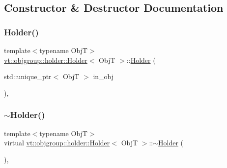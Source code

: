 \subsection{Constructor \& Destructor Documentation}
\mbox{\label{structvt_1_1objgroup_1_1holder_1_1_holder_a7e21e5a25aaef942ad43d07e14e726eb}} 
\subsubsection{\texorpdfstring{Holder()}{Holder()}}
{\footnotesize\ttfamily template$<$typename ObjT$>$ \\
\hyperlink{structvt_1_1objgroup_1_1holder_1_1_holder}{vt\+::objgroup\+::holder\+::\+Holder}$<$ ObjT $>$\+::\hyperlink{structvt_1_1objgroup_1_1holder_1_1_holder}{Holder} (\begin{DoxyParamCaption}\item[{std\+::unique\+\_\+ptr$<$ ObjT $>$}]{in\+\_\+obj }\end{DoxyParamCaption})\hspace{0.3cm}{\ttfamily [inline]}, {\ttfamily [explicit]}}

\mbox{\label{structvt_1_1objgroup_1_1holder_1_1_holder_acc7eb26ff3152043f63164898469fc78}} 
\subsubsection{\texorpdfstring{$\sim$\+Holder()}{~Holder()}}
{\footnotesize\ttfamily template$<$typename ObjT$>$ \\
virtual \hyperlink{structvt_1_1objgroup_1_1holder_1_1_holder}{vt\+::objgroup\+::holder\+::\+Holder}$<$ ObjT $>$\+::$\sim$\hyperlink{structvt_1_1objgroup_1_1holder_1_1_holder}{Holder} (\begin{DoxyParamCaption}{ }\end{DoxyParamCaption})\hspace{0.3cm}{\ttfamily [virtual]}, {\ttfamily [default]}}



